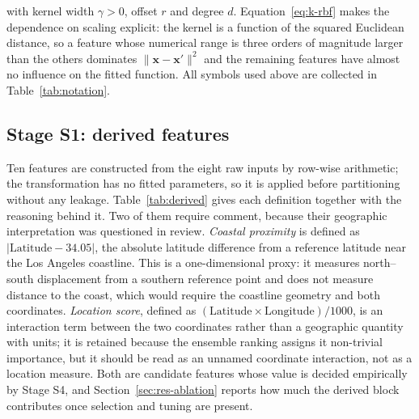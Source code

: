 \documentclass[pdflatex,sn-mathphys-num]{sn-jnl}
\begin{document}
with kernel width $\gamma > 0$, offset $r$ and degree $d$. Equation~\eqref{eq:k-rbf} makes the dependence on scaling explicit: the kernel is a function of the squared Euclidean distance, so a feature whose numerical range is three orders of magnitude larger than the others dominates $\lVert \mathbf{x} - \mathbf{x}' \rVert^{2}$ and the remaining features have almost no influence on the fitted function. All symbols used above are collected in Table~\ref{tab:notation}.



\subsection{Stage S1: derived features}\label{sec:derived}
Ten features are constructed from the eight raw inputs by row-wise arithmetic; the transformation has no fitted parameters, so it is applied before partitioning without any leakage. Table~\ref{tab:derived} gives each definition together with the reasoning behind it. Two of them require comment, because their geographic interpretation was questioned in review. \emph{Coastal proximity} is defined as $|\text{Latitude} - 34.05|$, the absolute latitude difference from a reference latitude near the Los Angeles coastline. This is a one-dimensional proxy: it measures north--south displacement from a southern reference point and does not measure distance to the coast, which would require the coastline geometry and both coordinates. \emph{Location score}, defined as $(\text{Latitude} \times \text{Longitude})/1000$, is an interaction term between the two coordinates rather than a geographic quantity with units; it is retained because the ensemble ranking assigns it non-trivial importance, but it should be read as an unnamed coordinate interaction, not as a location measure. Both are candidate features whose value is decided empirically by Stage S4, and Section~\ref{sec:res-ablation} reports how much the derived block contributes once selection and tuning are present.


\end{document}
